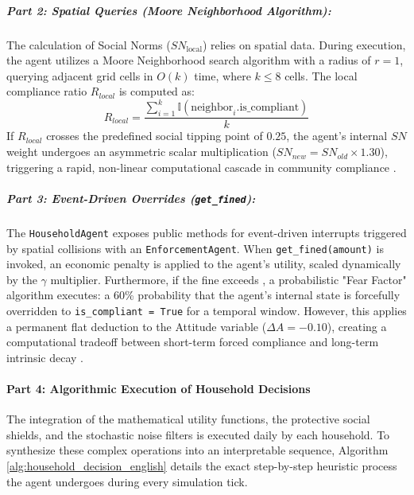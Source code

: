 \subparagraph{Part 2: Spatial Queries (Moore Neighborhood Algorithm):} 
The calculation of Social Norms ($SN_{\mathrm{local}}$) relies on spatial data. During execution, the agent utilizes a Moore Neighborhood search algorithm with a radius of $r=1$, querying adjacent grid cells in $O(k)$ time, where $k \le 8$ cells. The local compliance ratio $R_{local}$ is computed as:
\begin{equation}
    R_{local} = \frac{\sum_{i=1}^{k} \mathbb{I}(\text{neighbor}_i.\text{is\_compliant})}{k}
\end{equation}
If $R_{local}$ crosses the predefined social tipping point of $0.25$, the agent's internal $SN$ weight undergoes an asymmetric scalar multiplication ($SN_{new} = SN_{old} \times 1.30$), triggering a rapid, non-linear computational cascade in community compliance \citep{Centola2018}.

\subparagraph{Part 3: Event-Driven Overrides (\texttt{get\_fined}):} 
The \texttt{HouseholdAgent} exposes public methods for event-driven interrupts triggered by spatial collisions with an \texttt{EnforcementAgent}. When \texttt{get\_fined(amount)} is invoked, an economic penalty is applied to the agent's utility, scaled dynamically by the $\gamma$ multiplier. Furthermore, if the fine exceeds , a probabilistic "Fear Factor" algorithm executes: a 60\% probability that the agent's internal state is forcefully overridden to \texttt{is\_compliant = True} for a temporal window. However, this applies a permanent flat deduction to the Attitude variable ($\Delta A = -0.10$), creating a computational tradeoff between short-term forced compliance and long-term intrinsic decay \citep{Hertweck2023}.

\paragraph{Part 4: Algorithmic Execution of Household Decisions}

The integration of the mathematical utility functions, the protective social shields, and the stochastic noise filters is executed daily by each household. To synthesize these complex operations into an interpretable sequence, Algorithm \ref{alg:household_decision_english} details the exact step-by-step heuristic process the agent undergoes during every simulation tick.

